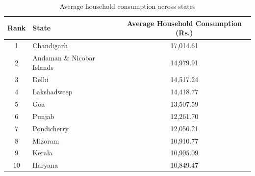 \begin{table}[H]
\centering
\caption{Average household consumption across states}
\begin{tabular}{clc}
\toprule
Rank & State & Average Household Consumption (Rs.) \\
\midrule
1&Chandigarh&17,014.61\\
2&Andaman \& Nicobar Islands&14,979.91\\
3&Delhi&14,517.24\\
4&Lakshadweep&14,418.77\\
5&Goa&13,507.59\\
6&Punjab&12,261.70\\
7&Pondicherry&12,056.21\\
8&Mizoram&10,910.77\\
9&Kerala&10,905.09\\
10&Haryana&10,849.47\\
\bottomrule
\end{tabular}
\end{table}
